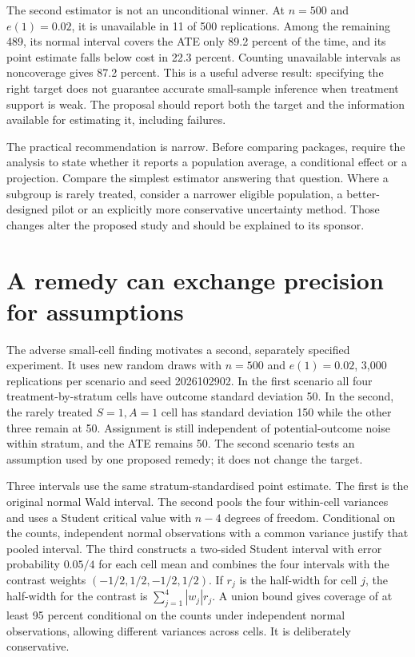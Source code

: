 The second estimator is not an unconditional winner. At $n=500$ and $e(1)=0.02$,
it is unavailable in 11 of 500 replications. Among the remaining 489, its normal
interval covers the ATE only 89.2 percent of the time, and its point estimate
falls below cost in 22.3 percent. Counting unavailable intervals as noncoverage
gives 87.2 percent. This is a useful adverse result: specifying the right target
does not guarantee accurate small-sample inference when treatment support is
weak. The proposal should report both the target and the information available
for estimating it, including failures.

The practical recommendation is narrow. Before comparing packages, require
the analysis to state whether it reports a population average, a conditional
effect or a projection. Compare the simplest estimator answering that question.
Where a subgroup is rarely treated, consider a narrower eligible population,
a better-designed pilot or an explicitly more conservative uncertainty method.
Those changes alter the proposed study and should be explained to its sponsor.

\section{A remedy can exchange precision for assumptions}
The adverse small-cell finding motivates a second, separately specified
experiment. It uses new random draws with $n=500$ and $e(1)=0.02$, 3,000
replications per scenario and seed 2026102902. In the first scenario all four
treatment-by-stratum cells have outcome standard deviation 50. In the second,
the rarely treated $S=1,A=1$ cell has standard deviation 150 while the other
three remain at 50. Assignment is still independent of potential-outcome noise
within stratum, and the ATE remains 50. The second scenario tests an assumption
used by one proposed remedy; it does not change the target.

Three intervals use the same stratum-standardised point estimate. The first is
the original normal Wald interval. The second pools the four within-cell
variances and uses a Student critical value with $n-4$ degrees of freedom.
Conditional on the counts, independent normal observations with a common
variance justify that pooled interval. The third constructs a two-sided Student
interval with error probability $0.05/4$ for each cell mean and combines the
four intervals with the contrast weights $(-1/2,1/2,-1/2,1/2)$. If $r_j$ is
the half-width for cell $j$, the half-width for the contrast is
$\sum_{j=1}^4 |w_j|r_j$. A union bound gives coverage of at least 95 percent
conditional on the counts under independent normal observations, allowing
different variances across cells. It is deliberately conservative.


